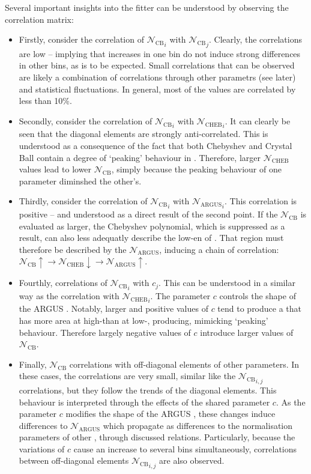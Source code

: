 Several important insights into the fitter can be understood by observing the correlation matrix:
\begin{itemize}
\item
Firstly, consider the correlation of ${\mathcal{N}_{\mathrm{CB}}}_i$ with ${\mathcal{N}_{\mathrm{CB}}}_j$.
Clearly, the correlations are low -- implying that increases in one bin do not induce strong differences in other bins, as is to be expected.
Small correlations that can be observed are likely a combination of correlations through other parametrs (see later) and statistical fluctuations.
In general, most of the values are correlated by less than 10\%.
\item Secondly, consider the correlation of ${\mathcal{N}_{\mathrm{CB}}}_i$ with ${\mathcal{N}_{\mathrm{CHEB}}}_i$.
It can clearly be seen that the diagonal elements are strongly anti-correlated.
This is understood as a consequence of the fact that both Chebyshev and Crystal Ball  contain a degree of `peaking' behaviour in \Mbc.
Therefore, larger $\mathcal{N}_{\mathrm{CHEB}}$ values lead to lower ${\mathcal{N}_{\mathrm{CB}}}$, simply because the peaking behaviour of one parameter diminshed the other's.
\item Thirdly, consider the correlation of ${\mathcal{N}_{\mathrm{CB}}}_i$ with ${\mathcal{N}_{\mathrm{ARGUS}}}_i$.
This correlation is positive -- and understood as a direct result of the second point.
If the $\mathcal{N}_{\mathrm{CB}}$ is evaluated as larger, the Chebyshev polynomial, which is suppressed as a result, can also less adequatly describe the low-en of \Mbc.
That region must therefore be described by the $\mathcal{N}_{\mathrm{ARGUS}}$, inducing a chain of correlation: $\mathcal{N}_{\mathrm{CB}}\uparrow\rightarrow{\mathcal{N}_{\mathrm{CHEB}}}\downarrow\rightarrow\mathcal{N}_{\mathrm{ARGUS}}\uparrow$.
\item Fourthly, correlations of ${\mathcal{N}_{\mathrm{CB}}}_i$ with $c_j$.
This can be understood in a similar way as the correlation with ${\mathcal{N}_{\mathrm{CHEB}}}_i$.
The parameter $c$ controls the shape of the ARGUS .
Notably, larger and positive values of $c$ tend to produce a \PDF that has more area at high-\Mbc than at low-\Mbc, producing, mimicking `peaking' behaviour.
Therefore largely negative values of $c$ introduce larger values of $\mathcal{N}_{\mathrm{CB}}$.
\item Finally, $\mathcal{N}_{\mathrm{CB}}$ correlations with off-diagonal elements of other parameters.
In these cases, the correlations are very small, similar like the ${\mathcal{N}_{\mathrm{CB}}}_{i,j}$ correlations, but they follow the trends of the diagonal elements.
This behaviour is interpreted through the effects of the shared parameter $c$.
As the parameter $c$ modifies the shape of the ARGUS \PDF, these changes induce differences to $\mathcal{N}_{\mathrm{ARGUS}}$ which propagate as differences to the normalisation parameters of other , through discussed relations.
Particularly, because the variations of $c$ cause an increase to several bins simultaneously, correlations between off-diagonal elements ${\mathcal{N}_{\mathrm{CB}}}_{i,j}$ are also observed.
\end{itemize}

